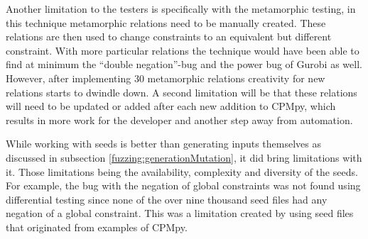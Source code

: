 Another limitation to the testers is specifically with the metamorphic testing, in this technique metamorphic relations need to be manually created. These relations are then used to change constraints to an equivalent but different constraint. With more particular relations the technique would have been able to find at minimum the “double negation”-bug and the power bug of Gurobi as well. However, after implementing 30 metamorphic relations creativity for new relations starts to dwindle down. A second limitation will be that these relations will need to be updated or added after each new addition to CPMpy, which results in more work for the developer and another step away from automation.


While working with seeds is better than generating inputs themselves as discussed in subsection \ref{fuzzing:generationMutation}, it did bring limitations with it. Those limitations being the availability, complexity and diversity of the seeds. For example, the bug with the negation of global constraints was not found using differential testing since none of the over nine thousand seed files had any negation of a global constraint. This was a limitation created by using seed files that originated from examples of CPMpy.




